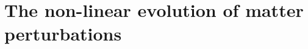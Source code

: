 \chapter{The non-linear evolution of matter perturbations \label{chap:nonlinear}} %








%
%
%
%

